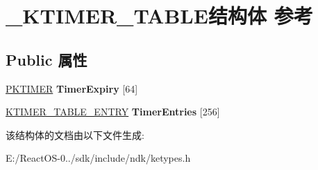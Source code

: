 \hypertarget{struct___k_t_i_m_e_r___t_a_b_l_e}{}\section{\+\_\+\+K\+T\+I\+M\+E\+R\+\_\+\+T\+A\+B\+L\+E结构体 参考}
\label{struct___k_t_i_m_e_r___t_a_b_l_e}
\subsection*{Public 属性}
\begin{DoxyCompactItemize}
\item 
\mbox{\label{struct___k_t_i_m_e_r___t_a_b_l_e_add79f138ae12c2cac3ea491805a3d99d}} 
\hyperlink{struct___k_t_i_m_e_r}{P\+K\+T\+I\+M\+ER} {\bfseries Timer\+Expiry} \mbox{[}64\mbox{]}
\item 
\mbox{\label{struct___k_t_i_m_e_r___t_a_b_l_e_a7e982ba2cde32378283413937bd4d6af}} 
\hyperlink{struct___k_t_i_m_e_r___t_a_b_l_e___e_n_t_r_y}{K\+T\+I\+M\+E\+R\+\_\+\+T\+A\+B\+L\+E\+\_\+\+E\+N\+T\+RY} {\bfseries Timer\+Entries} \mbox{[}256\mbox{]}
\end{DoxyCompactItemize}


该结构体的文档由以下文件生成\+:\begin{DoxyCompactItemize}
\item 
E\+:/\+React\+O\+S-\/0../sdk/include/ndk/ketypes.\+h\end{DoxyCompactItemize}
